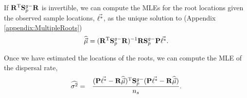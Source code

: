 If $\mathbf{R}^\text{T}\mathbf{S}_p^{g-}\mathbf{R}$ is invertible, we can compute the MLEs for the root locations given the observed sample locations, $\vec{\ell^*}$, as the unique solution to (Appendix \ref{appendix:MultipleRoots})
%
\begin{eqnarray}
 \widehat{\vec{\mu}} = (\mathbf{R}^\text{T}\mathbf{S}_p^{g-}\mathbf{R})^{-1} \mathbf{R}\mathbf{S}_p^{g-}\mathbf{P}\vec{\ell^*}.   
\end{eqnarray}



Once we have estimated the locations of the roots, we can compute the MLE of the dispersal rate,
\begin{eqnarray}\label{eq:sigmaMLE}
    \widehat{\sigma^2} &=& \displaystyle \frac{ (\mathbf{P}\vec{\ell^*} - \mathbf{R}\widehat{\vec{\mu}})^\text{T} \mathbf{S}_p^{g-} (\mathbf{P}\vec{\ell^*} - \mathbf{R}\widehat{\vec{\mu}}) }{n_s}.
\end{eqnarray}

